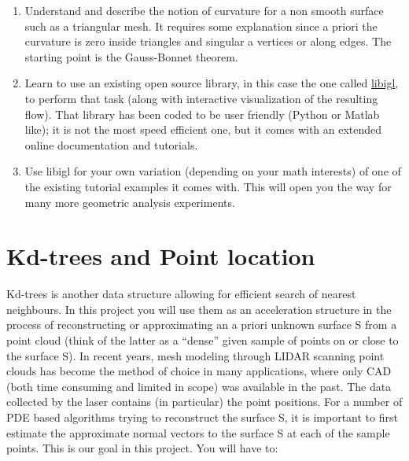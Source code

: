 \documentclass[11pt]{article}
\begin{document}
\begin{enumerate}
	\item
	Understand and describe the notion of curvature for a non smooth surface such as a
triangular mesh. It requires some explanation since a priori the curvature is zero inside
triangles and singular a vertices or along edges. The starting point is the Gauss-Bonnet
theorem.
	\item Learn to use an existing open source library, in this case the one called 
	\href{https://libigl.github.io}{libigl}, to perform
	that task (along with interactive visualization of the resulting flow). That library has been
	coded to be user friendly (Python or Matlab like); it is not the most speed efficient one, but 
	it comes with an extended online documentation and tutorials.
	\item Use libigl for your own variation (depending on your math interests) of one of the existing
	tutorial examples it comes with. This will open you the way for many more geometric
	analysis experiments.
\end{enumerate}

\section{Kd-trees and Point location}

Kd-trees is another data structure allowing for efficient search of nearest neighbours. In this
project you will use them as an acceleration structure in the process of reconstructing or 
approximating an a priori unknown surface S from a point cloud (think of the latter as a 
“dense” given sample of points on or close to the surface S). In recent years, mesh modeling through LIDAR
scanning point clouds has become the method of choice in many applications, where only CAD
(both time consuming and limited in scope) was available in the past. The data collected by the
laser contains (in particular) the point positions. For a number of PDE based algorithms trying
to reconstruct the surface S, it is important to first estimate the approximate normal vectors to
the surface S at each of the sample points. This is our goal in this project. You will have to:
\end{document}
